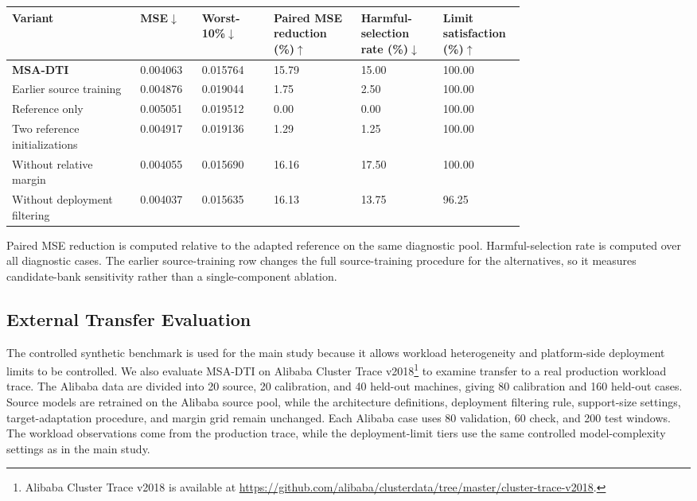 \documentclass[a4paper,fleqn]{cas-sc}
\begin{document}
\begin{center}
\begin{minipage}{\linewidth}
\label{tab:component}
\centering
\scriptsize
\renewcommand{\arraystretch}{1.08}
\setlength{\tabcolsep}{2.2pt}
\begin{tabularx}{\linewidth}
{Y Z{0.12\linewidth} Z{0.14\linewidth} Z{0.17\linewidth} Z{0.16\linewidth} Z{0.16\linewidth}}
\toprule
Variant
& MSE$\downarrow$
& Worst-10\%$\downarrow$
& Paired MSE reduction (\%)$\uparrow$
& Harmful-selection rate (\%)$\downarrow$
& Limit satisfaction (\%)$\uparrow$ \\
\midrule
\textbf{MSA-DTI} & 0.004063 & 0.015764 & 15.79 & 15.00 & 100.00 \\
Earlier source training & 0.004876 & 0.019044 & 1.75 & 2.50 & 100.00 \\
Reference only & 0.005051 & 0.019512 & 0.00 & 0.00 & 100.00 \\
Two reference initializations & 0.004917 & 0.019136 & 1.29 & 1.25 & 100.00 \\
Without relative margin & 0.004055 & 0.015690 & 16.16 & 17.50 & 100.00 \\
Without deployment filtering & 0.004037 & 0.015635 & 16.13 & 13.75 & 96.25 \\
\bottomrule
\end{tabularx}
\vspace{2pt}
\par\footnotesize
Paired MSE reduction is computed relative to the adapted reference on the same
diagnostic pool. Harmful-selection rate is computed over all diagnostic
cases. The earlier source-training row changes the full source-training
procedure for the alternatives, so it measures candidate-bank sensitivity
rather than a single-component ablation.
\end{minipage}
\end{center}

\subsection{External Transfer Evaluation}
\label{subsec:external}

The controlled synthetic benchmark is used for the main study because it
allows workload heterogeneity and platform-side deployment limits to be
controlled.
We also evaluate MSA-DTI on Alibaba Cluster Trace v2018\footnote{Alibaba
Cluster Trace v2018 is available at
\url{https://github.com/alibaba/clusterdata/tree/master/cluster-trace-v2018}.}
to examine transfer to a real production workload trace. The Alibaba data are
divided into 20 source, 20 calibration, and 40 held-out machines, giving 80
calibration and 160 held-out cases. Source models are retrained on the Alibaba
source pool, while the architecture definitions, deployment filtering rule,
support-size settings, target-adaptation procedure, and margin grid remain
unchanged. Each Alibaba case uses 80 validation, 60 check, and 200 test windows.
The workload observations come from the production trace, while the
deployment-limit tiers use the same controlled model-complexity settings as in
the main study.
\end{document}
